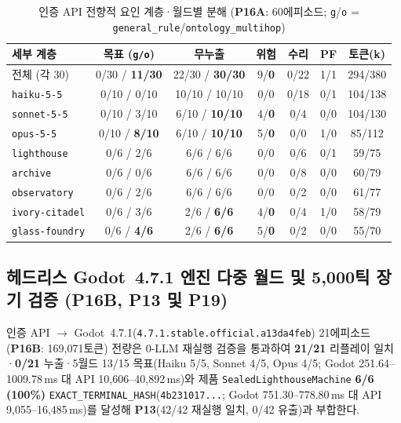 \begin{table}[!tbp]
\caption{인증 API 전향적 요인 계층·월드별 분해 (\textbf{P16A}: 60에피소드; \texttt{g}/\texttt{o} = \texttt{general\_rule}/\texttt{ontology\_multihop})}
\label{tab:kbs-p16a}
\centering
\scriptsize
\setlength{\tabcolsep}{1.5pt}
\begin{tabularx}{\columnwidth}{@{}>{\raggedright\arraybackslash}X*{6}{c}@{}}
\toprule
\textbf{세부 계층} & \textbf{목표 (\texttt{g/o})} & \textbf{무누출} & \textbf{위험} & \textbf{수리} & \textbf{PF} & \textbf{토큰(k)} \\
\midrule
전체 (각 30) & 0/30 / \textbf{11/30} & 22/30 / \textbf{30/30} & 9/\textbf{0} & 0/22 & 1/1 & 294/380 \\
\texttt{haiku-5-5} & 0/10 / 0/10 & 10/10 / 10/10 & 0/0 & 0/18 & 0/1 & 104/138 \\
\texttt{sonnet-5-5} & 0/10 / 3/10 & 6/10 / \textbf{10/10} & 4/\textbf{0} & 0/4 & 0/0 & 104/130 \\
\texttt{opus-5-5} & 0/10 / \textbf{8/10} & 6/10 / \textbf{10/10} & 5/\textbf{0} & 0/0 & 1/0 & 85/112 \\
\midrule
\texttt{lighthouse} & 0/6 / 2/6 & 6/6 / 6/6 & 0/0 & 0/6 & 0/1 & 59/75 \\
\texttt{archive} & 0/6 / 0/6 & 6/6 / 6/6 & 0/0 & 0/8 & 0/0 & 60/79 \\
\texttt{observatory} & 0/6 / 2/6 & 6/6 / 6/6 & 0/0 & 0/2 & 0/0 & 61/77 \\
\texttt{ivory-citadel} & 0/6 / 3/6 & 2/6 / \textbf{6/6} & 4/\textbf{0} & 0/4 & 1/0 & 58/79 \\
\texttt{glass-foundry} & 0/6 / \textbf{4/6} & 2/6 / \textbf{6/6} & 5/\textbf{0} & 0/2 & 0/0 & 55/70 \\
\bottomrule
\end{tabularx}
\end{table}

\subsection{헤드리스 Godot~4.7.1 엔진 다중 월드 및 5,000틱 장기 검증 (\textbf{P16B}, \textbf{P13} 및 \textbf{P19})}\label{sec:kbs-godot}
인증 API $\rightarrow$ Godot~4.7.1(\texttt{4.7.1.\allowbreak stable.\allowbreak official.\allowbreak a13da4feb}) 21에피소드(\textbf{P16B}: 169,071토큰) 전량은 0-LLM 재실행 검증을 통과하여 \textbf{21/21} 리플레이 일치·\textbf{0/21} 누출·5월드 13/15 목표(Haiku 5/5, Sonnet 4/5, Opus 4/5; Godot 251.64--1009.78\,ms 대 API 10,606--40,892\,ms)와 제품 \texttt{Sealed\allowbreak Lighthouse\allowbreak Machine} \textbf{6/6 (100\%)} \texttt{EXACT\_\allowbreak TERMINAL\_\allowbreak HASH}(\texttt{4b231017...}; Godot 751.30--778.80\,ms 대 API 9,055--16,485\,ms)를 달성해 \textbf{P13}(42/42 재실행 일치, 0/42 유출)과 부합한다.

